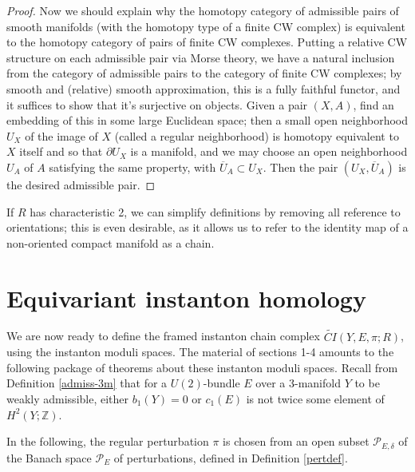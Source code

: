 \documentclass[10pt,a4paper]{amsart}
\theoremstyle{definition}
\theoremstyle{remark}
\numberwithin{figure}{qchap}
\begin{document}
\begin{proof}
Now we should explain why the homotopy category of admissible pairs of smooth manifolds (with the homotopy type of a finite CW complex) is equivalent to the homotopy category of pairs of finite CW complexes. Putting a relative CW structure on each admissible pair via Morse theory, we have a natural inclusion from the category of admissible pairs to the category of finite CW complexes; by smooth and (relative) smooth approximation, this is a fully faithful functor, and it suffices to show that it's surjective on objects. Given a pair $(X,A)$, find an embedding of this in some large Euclidean space; then a small open neighborhood $U_X$ of the image of $X$ (called a regular neighborhood) is homotopy equivalent to $X$ itself and so that $\partial U_X$ is a manifold, and we may choose an open neighborhood $U_A$ of $A$ satisfying the same property, with $\overline{U}_A \subset U_X$. Then the pair $(U_X, \overline{U}_A)$ is the desired admissible pair.
\end{proof}

If $R$ has characteristic 2, we can simplify definitions by removing all reference to orientations; this is even desirable, as it allows us to refer to the identity map of a non-oriented compact manifold as a chain.

\section{Equivariant instanton homology}\label{sec:Floer-eqinst}
We are now ready to define the framed instanton chain complex $\widetilde{CI}(Y,E,\pi;R)$, using the instanton moduli spaces. The material of sections 1-4 amounts to the following package of theorems about these instanton moduli spaces. Recall from Definition \ref{admiss-3m} that for a $U(2)$-bundle $E$ over a 3-manifold $Y$ to be weakly admissible, either $b_1(Y) = 0$ or $c_1(E)$ is not twice some element of $H^2(Y;\mathbb Z)$.

In the following, the regular perturbation $\pi$ is chosen from an open subset $\mathcal P_{E,\delta}$ of the Banach space $\mathcal P_E$ of perturbations, defined in Definition \ref{pertdef}. 
\end{document}
